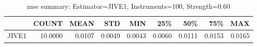 \begin{table}[ht]
\centering
\caption{mse summary: Estimator=JIVE1, Instruments=100, Strength=0.60}
\begin{tabular}{lrrrrrrrr}
\toprule
 & COUNT & MEAN & STD & MIN & 25\% & 50\% & 75\% & MAX \\
\midrule
JIVE1 & 10.0000 & 0.0107 & 0.0049 & 0.0043 & 0.0060 & 0.0111 & 0.0153 & 0.0165 \\
\bottomrule
\end{tabular}
\end{table}
